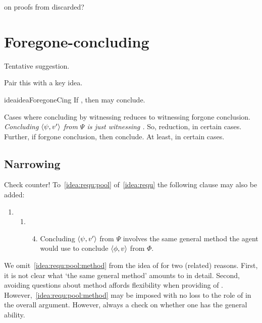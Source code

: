 \begin{note}
  \citeauthor{Easwaran:2009tm} on proofs from discarded?
\end{note}

\section{Foregone-concluding}

\begin{note}
  Tentative suggestion.
\end{note}

\begin{note}
  Pair this with a key idea.

  \begin{restatable}{idea}{ideaForegoneCing}
    \label{idea:reassignment}
    If \fc{}, then may conclude.
  \end{restatable}

  Cases where concluding by witnessing reduces to witnessing forgone conclusion.
  \emph{Concluding \(\langle \psi, v' \rangle\) from \(\Psi\) is just witnessing \fc{}.}
  So, reduction, in certain cases.
  Further, if forgone conclusion, then conclude.
  At least, in certain cases.
\end{note}

\subsection*{Narrowing }

\begin{note}
  {
    \color{red} Check counter!
  }
  To~\ref{idea:requ:pool} of~\autoref{idea:requ} the following clause may also be added:
  \begin{enumerate}[label=]
  \item
    \begin{enumerate}[label=]
    \item
      \begin{enumerate}[label=\roman*., ref=(\roman*)]
        \setcounter{enumiii}{3}
      \item
        \label{idea:requ:pool:method}
        Concluding \(\langle \psi, v' \rangle\) from \(\Psi\) involves the same general method the agent would use to conclude \(\langle \phi, v \rangle\) from \(\Phi\).
      \end{enumerate}
    \end{enumerate}
  \end{enumerate}
  We omit~\autoref{idea:requ:pool:method} from the idea of \csN{} for two (related) reasons.
  First, it is not clear what `the same general method' amounts to in detail.
  Second, avoiding questions about method affords flexibility when providing  of \zS{}.
  However,~\autoref{idea:requ:pool:method} may be imposed with no loss to the role of \zS{} in the overall argument.
  However, always a check on whether one has the general ability.
\end{note}

